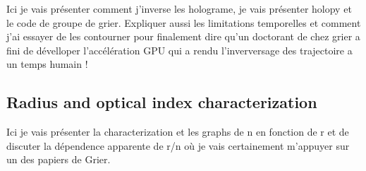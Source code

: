 Ici je vais présenter comment j'inverse les holograme, je vais présenter holopy et le code de groupe de grier. Expliquer aussi les limitations temporelles et comment j'ai essayer de les contourner pour finalement dire qu'un doctorant de chez grier a fini de dévelloper l'accélération GPU qui a rendu l'inverversage des trajectoire a un temps humain !

\subsection{Radius and optical index characterization}


Ici je vais présenter la characterization et les graphs de n en fonction de r et de discuter la dépendence apparente de r/n où je vais certainement m'appuyer sur un des papiers de Grier. 

